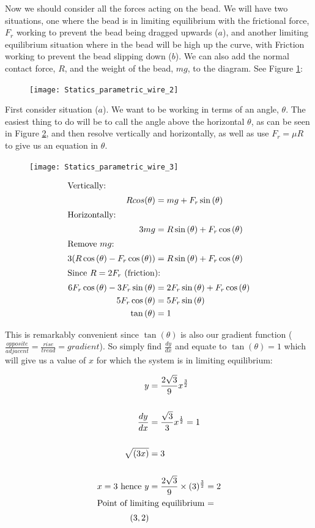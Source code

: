 \begin{problem}[A1989MsQ6l]
{{Now we should consider all the forces acting on the bead. We will have two situations, one where the bead is in limiting equilibrium with the frictional force, $F_r$ working to prevent the bead being dragged upwards ($a$), and another limiting equilibrium situation where in the bead will be high up the curve, with Friction working to prevent the bead slipping down ($b$). We can also add the normal contact force, $R$, and the weight of the bead, $mg$, to the diagram. See Figure \ref{fig:Statics_parametric_wire_2}:

 \begin{figure}[h]
	\centering
	\texttt{[image: Statics\_parametric\_wire\_2]}
	\caption{}	
	\label{fig:Statics_parametric_wire_2}
\end{figure}

First consider situation ($a$). We want to be working in terms of an angle, $\theta$. The easiest thing to do will be to call the angle above the horizontal $\theta$, as can be seen in Figure \ref{fig:Statics_parametric_wire_3}, and then resolve vertically and horizontally, as well as use $F_r = \mu R$ to give us an equation in $\theta$. 

 \begin{figure}[h]
	\centering
	\texttt{[image: Statics\_parametric\_wire\_3]}
	\caption{}	
	\label{fig:Statics_parametric_wire_3}
\end{figure}

\begin{align*} \intertext{Vertically:} Rcos{(\theta)} &= mg + F_r\sin{(\theta)} \\
\intertext{Horizontally:} 3mg&=R\sin{(\theta)} +F_r\cos{(\theta)} \\
\intertext{Remove $mg$:} 3(R\cos{(\theta)} - F_r\cos{(\theta)}) &= R\sin{(\theta)} + F_r\cos{(\theta)} \\
\intertext{Since $R = 2 F_r$ (friction):} 6F_r\cos{(\theta)} - 3F_r\sin{(\theta)} &= 2F_r \sin{(\theta)} +F_r \cos{(\theta)} \\
5F_r\cos{(\theta)} &= 5F_r\sin{(\theta)} \\
\tan{(\theta)} &= 1 \end{align*}

This is remarkably convenient since $\tan{(\theta)}$ is also our gradient function ($\frac{opposite}{adjacent} = \frac{rise}{tread} = gradient$). So simply find $\frac{dy}{dx}$ and equate to $\tan{(\theta)} = 1$ which will give us a value of $x$ for which the system is in limiting equilibrium:

\begin{align*}y &= \frac{2\sqrt{3}}{9}x^{\frac{3}{2}} \\
\\ \frac{dy}{dx} &= \frac{\sqrt{3}}{3}x^{\frac{1}{2}} = 1 \\
\\ \sqrt{(3x)} &= 3 \\
\\x = 3 \textrm{ hence } y &= \frac{2\sqrt{3}}{9}\times (3)^{\frac{3}{2}} = 2 \\
\intertext{Point of limiting equilibrium =} (3,2) \end{align*}

}}
\end{problem}

